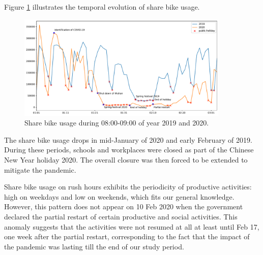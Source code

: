 \documentclass[ijgi,submit,moreauthors,pdftex]{Definitions/mdpi}
\begin{document}

Figure \ref{fig:hour_comparison_8} %
 illustrates the temporal evolution of share bike usage.

\begin{figure}[ht]
    \centering
    \includegraphics[width=0.9\textwidth]{Figures/hour_8-eps-converted-to.pdf}
    \caption{Share bike usage during 08:00-09:00 of year 2019 and 2020.}
    \label{fig:hour_comparison_8}
\end{figure}

The share bike usage drops in mid-January of 2020 and early February of 2019.
During these periods, schools and workplaces were closed as part of the Chinese New Year holiday 2020.
The overall closure was then forced to be extended to mitigate the pandemic.

Share bike usage on rush hours exhibits the periodicity of productive activities: high on weekdays and low on weekends, which fits our general knowledge.
However, this pattern does not appear on 10 Feb 2020 when the government declared the partial restart of certain productive and social activities.
This anomaly suggests that the activities were not resumed at all at least until Feb 17, one week after the partial restart, corresponding to the fact that the impact of the pandemic was lasting till the end of our study period.
\end{document}
